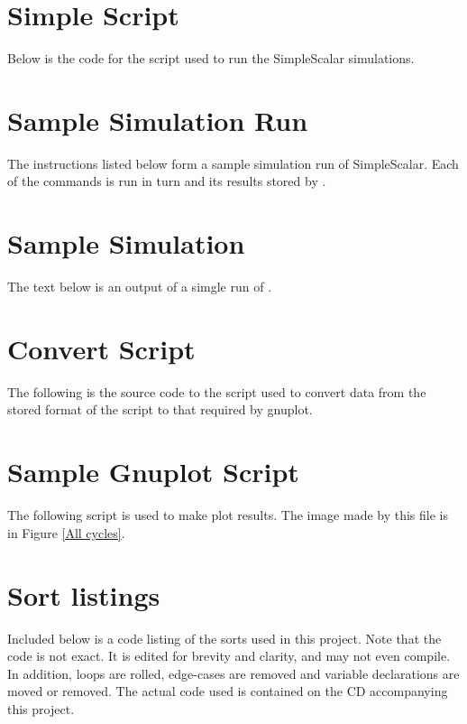 \section{Simple Script}
Below is the code for the script used to run the SimpleScalar simulations.

\label{Simple Script}

\section{Sample Simulation Run}
\label{Simple List}
The instructions listed below form a sample simulation run of SimpleScalar. Each
of the commands is run in turn and its results stored by .


\section{Sample Simulation}
The text below is an output of a simgle run of .
\label{Sample Simulation}


\section{Convert Script}
The following is the source code to the script used to convert data from the
stored format of the  script to that required by gnuplot.
\label{Convert Script}


\section{Sample Gnuplot Script}
\label{Sample Gnuplot Script}
The following script is used to make plot results. The image made by this file
is in Figure \vref{All cycles}.


\section{Sort listings}
Included below is a code listing of the sorts used in this project. Note that
the code is not exact. It is edited for brevity and clarity, and may not even
compile. In addition, loops are rolled, edge-cases are removed and variable
declarations are moved or removed. The actual code used is contained on the CD
accompanying this project.
\label{Sort Listings}

